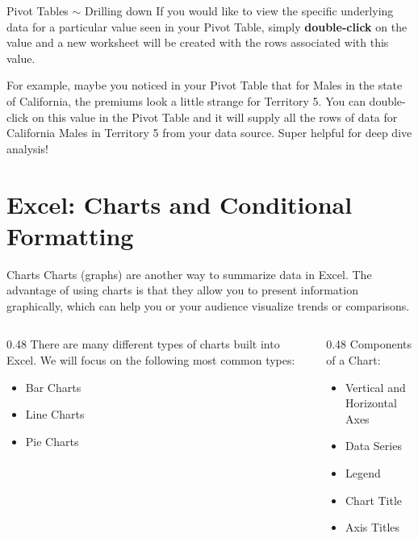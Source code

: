 \documentclass{beamer}
\begin{document}
\begin{frame}{Pivot Tables $\sim$ Drilling down}
If you would like to view the specific underlying data for a particular value seen in
your Pivot Table, simply \textbf{double-click} on the value and a new worksheet will be
created with the rows associated with this value.

\vspace{0.5em}
For example, maybe you noticed in your Pivot Table that for Males in the state of
California, the premiums look a little strange for Territory 5. You can double-click on
this value in the Pivot Table and it will supply all the rows of data for California
Males in Territory 5 from your data source. Super helpful for deep dive analysis!

\vspace{1em}
\textit{}
\end{frame}

\section{Excel: Charts and Conditional Formatting}

\sectionframe

\begin{frame}{Charts}
Charts (graphs) are another way to summarize data in Excel. The advantage of using charts
is that they allow you to present information graphically, which can help you or your
audience visualize trends or comparisons.
\vspace{0.5em}
\begin{columns}[T]
\begin{column}{0.48\textwidth}
There are many different types of charts built into Excel. We will focus on the following
most common types:
\begin{itemize}
  \item Bar Charts
  \item Line Charts
  \item Pie Charts
\end{itemize}
\end{column}
\begin{column}{0.48\textwidth}
Components of a Chart:
\begin{itemize}
  \item Vertical and Horizontal Axes
  \item Data Series
  \item Legend
  \item Chart Title
  \item Axis Titles
\end{itemize}
\end{column}
\end{columns}
\end{frame}
\end{document}
